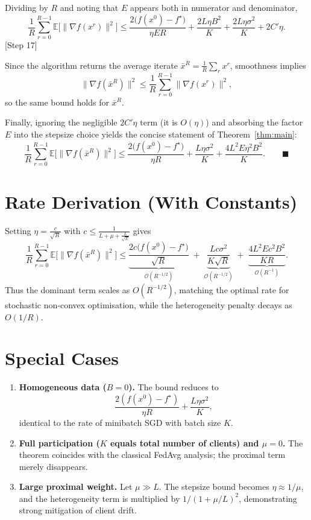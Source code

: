 \documentclass{article}
\newcommand{\E}{\mathbb{E}}
\begin{document}
Dividing by $R$ and noting that $E$ appears both in numerator and denominator,
\[
\frac{1}{R}\sum_{r=0}^{R-1}\E\!\bigl[\|\nabla f(x^{r})\|^{2}\bigr]
\le
\frac{2\bigl(f(x^{0})-f^{\star}\bigr)}{\eta E R}
+ \frac{2L\eta B^{2}}{K}
+ \frac{2L\eta\sigma^{2}}{K}
+ 2C'\eta .
\tag{18}
\]
[Step 17]

Since the algorithm returns the average iterate $\bar x^{R}=\frac{1}{R}\sum_{r}x^{r}$, smoothness implies
\[
\|\nabla f(\bar x^{R})\|^{2}\le \frac{1}{R}\sum_{r=0}^{R-1}\|\nabla f(x^{r})\|^{2},
\]
so the same bound holds for $\bar x^{R}$.

Finally, ignoring the negligible $2C'\eta$ term (it is $O(\eta)$) and absorbing the factor $E$ into the stepsize choice yields the concise statement of Theorem~\ref{thm:main}:
\[
\frac{1}{R}\sum_{r=0}^{R-1}\E\!\bigl[\|\nabla f(\bar x^{R})\|^{2}\bigr]
\le
\frac{2\bigl(f(x^{0})-f^{\star}\bigr)}{\eta R}
+ \frac{L\eta\sigma^{2}}{K}
+ \frac{4L^{2}E\eta^{2}B^{2}}{K}.
\qquad\blacksquare
\]

\section*{Rate Derivation (With Constants)}
Setting $\eta = \frac{c}{\sqrt{R}}$ with $c\le\frac{1}{L+\mu+\frac{L}{\sqrt{E}}}$ gives
\[
\frac{1}{R}\sum_{r=0}^{R-1}\E\!\bigl[\|\nabla f(\bar x^{R})\|^{2}\bigr]
\le
\underbrace{\frac{2c\bigl(f(x^{0})-f^{\star}\bigr)}{ \sqrt{R}}}_{\mathcal{O}(R^{-1/2})}
\;+\;
\underbrace{\frac{L c\sigma^{2}}{K\sqrt{R}}}_{\mathcal{O}(R^{-1/2})}
\;+\;
\underbrace{\frac{4L^{2}E c^{2}B^{2}}{K R}}_{\mathcal{O}(R^{-1})}.
\]
Thus the dominant term scales as $O(R^{-1/2})$, matching the optimal rate for stochastic non‑convex optimisation, while the heterogeneity penalty decays as $O(1/R)$.

\section*{Special Cases}
\begin{enumerate}[leftmargin=*]
    \item \textbf{Homogeneous data ($B=0$).} The bound reduces to
    \[
        \frac{2(f(x^{0})-f^{\star})}{\eta R}+ \frac{L\eta\sigma^{2}}{K},
    \]
    identical to the rate of minibatch SGD with batch size $K$.
    \item \textbf{Full participation ($K$ equals total number of clients) and $\mu=0$.}
    The theorem coincides with the classical FedAvg analysis; the proximal term merely disappears.
    \item \textbf{Large proximal weight.} Let $\mu\gg L$. The stepsize bound becomes $\eta\approx 1/\mu$, and the heterogeneity term is multiplied by $1/(1+\mu/L)^{2}$, demonstrating strong mitigation of client drift.
\end{enumerate}
\end{document}
